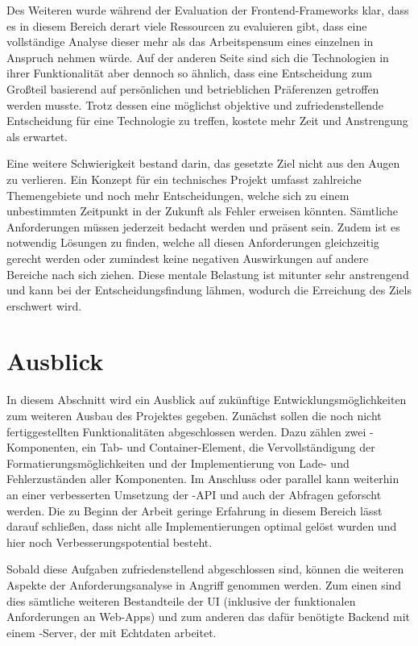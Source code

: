 Des Weiteren wurde während der Evaluation der Frontend-Frameworks klar, dass es in diesem Bereich derart viele Ressourcen zu evaluieren gibt, dass eine vollständige Analyse dieser mehr als das Arbeitspensum eines einzelnen in Anspruch nehmen würde. Auf der anderen Seite sind sich die Technologien in ihrer Funktionalität aber dennoch so ähnlich, dass eine Entscheidung zum Großteil basierend auf persönlichen und betrieblichen Präferenzen getroffen werden musste. Trotz dessen eine möglichst objektive und zufriedenstellende Entscheidung für eine Technologie zu treffen, kostete mehr Zeit und Anstrengung als erwartet.

Eine weitere Schwierigkeit bestand darin, das gesetzte Ziel nicht aus den Augen zu verlieren. Ein Konzept für ein technisches Projekt umfasst zahlreiche Themengebiete und noch mehr Entscheidungen, welche sich zu einem unbestimmten Zeitpunkt in der Zukunft als Fehler erweisen könnten. Sämtliche Anforderungen müssen jederzeit bedacht werden und präsent sein. Zudem ist es notwendig Lösungen zu finden, welche all diesen Anforderungen gleichzeitig gerecht werden oder zumindest keine negativen Auswirkungen auf andere Bereiche nach sich ziehen. Diese mentale Belastung ist mitunter sehr anstrengend und kann bei der Entscheidungsfindung lähmen, wodurch die Erreichung des Ziels erschwert wird.

\section{Ausblick}
In diesem Abschnitt wird ein Ausblick auf zukünftige Entwicklungsmöglichkeiten zum weiteren Ausbau des Projektes gegeben. Zunächst sollen die noch nicht fertiggestellten Funktionalitäten abgeschlossen werden. Dazu zählen zwei -Komponenten, ein Tab- und Container-Element, die Vervollständigung der Formatierungsmöglichkeiten und der Implementierung von Lade- und Fehlerzuständen aller Komponenten.
Im Anschluss oder parallel kann weiterhin an einer verbesserten Umsetzung der -API und auch der Abfragen geforscht werden. Die zu Beginn der Arbeit geringe Erfahrung in diesem Bereich lässt darauf schließen, dass nicht alle Implementierungen optimal gelöst wurden und hier noch Verbesserungspotential besteht.

Sobald diese Aufgaben zufriedenstellend abgeschlossen sind, können die weiteren Aspekte der Anforderungsanalyse in Angriff genommen werden. Zum einen sind dies sämtliche weiteren Bestandteile der UI (inklusive der funktionalen Anforderungen an Web-Apps) und zum anderen das dafür benötigte Backend mit einem -Server, der mit Echtdaten arbeitet.
